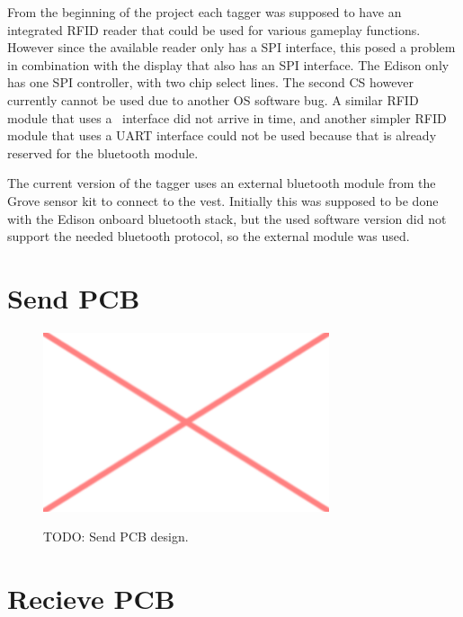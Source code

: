 From the beginning of the project each tagger was supposed to have an integrated RFID reader that could be used for various gameplay functions. However since the available reader only has a SPI interface, this posed a problem in combination with the display that also has an SPI interface. The Edison only has one SPI controller, with two chip select lines. The second CS however currently cannot be used due to another OS software bug. A similar RFID module that uses a \isqc~interface did not arrive in time, and another simpler RFID module that uses a UART interface could not be used because that is already reserved for the bluetooth module.

The current version of the tagger uses an external bluetooth module from the Grove sensor kit  to connect to the vest. Initially this was supposed to be done with the Edison onboard bluetooth stack, but the used software version did not support the needed bluetooth protocol, so the external module was used.



\section{Send PCB}

\begin{figure}[h!]
\centering
\includegraphics[width=0.75\textwidth]{images/placeholder.png}\\
\caption[Send PCB]{TODO: Send PCB design.}
\label{fig:tag_ed_send}
\end{figure}

\section{Recieve PCB}

